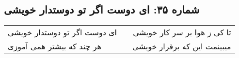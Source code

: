 \begin{center}
\section*{شماره ۳۵: ای دوست اگر تو دوستدار خویشی}
\label{sec:035}
\begin{longtable}{l p{0.5cm} r}
ای دوست اگر تو دوستدار خویشی
&&
تا کی ز هوا بر سر کار خویشی
\\
هر چند که بیشتر همی آموزی
&&
میبینمت این که برقرار خویشی
\\
\end{longtable}
\end{center}
